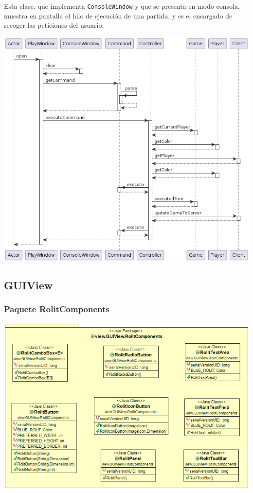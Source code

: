 \documentclass[../DocumentoOficial.tex]{subfiles}
\begin{document}
Esta clase, que implementa \texttt{ConsoleWindow} y que se presenta en modo consola, muestra en pantalla el hilo de ejecución de una partida, y es el encargado de recoger las peticiones del usuario.
\begin{center}
\includegraphics[scale=0.5]{PlayWindow_open.png}
\end{center}

\newpage
\subsection{GUIView}
\label{subsec:GUIView}
\subsubsection{Paquete RolitComponents}
\begin{center}
\includegraphics[scale=0.5]{RolitComponents.png} 
\end{center}
\end{document}
